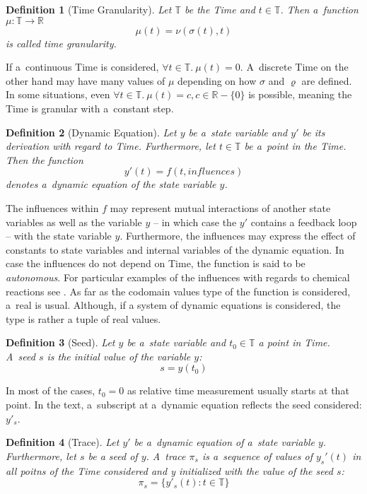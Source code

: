 \documentclass[12pt,oneside,draft]{fithesis}
\newcommand{\mReal}{\mathbb{R}}
\newcommand{\mTime}{\mathbb{T}}
\newtheorem{mydef}{Definition}
\begin{document}
\begin{mydef}[Time Granularity]
Let $\mTime$ be the Time and $t \in \mTime$. Then a~function
$\mu: \mTime \rightarrow \mReal$
	\begin{equation}
		\mu{}(t) = \nu{}(\sigma{}(t), t)
	\end{equation} is called time granularity.
\end{mydef}
If a~continuous Time is considered, $\forall{}t\in\mTime.\:\mu{}(t) = 0$.
A~discrete Time on the other hand may have many values of $\mu$
depending on how $\sigma$ and $\varrho$ are defined. In some situations,
even $\forall{}t\in\mTime.\:\mu{}(t) = c, c \in \mReal - \{0\}$ is possible,
meaning the Time is granular with a~constant step.

\begin{mydef}[Dynamic Equation]
Let $y$ be a~state variable and $y'$ be its derivation with regard to
Time. Furthermore, let $t \in \mTime$ be a~point in the Time.
Then the function
	\begin{equation}
		y'(t)=f(t, influences)
	\end{equation}
denotes a~dynamic equation of the state variable $y$.
\end{mydef}
The influences within $f$ may represent mutual interactions of another
state variables as well as the variable $y$ -- in which case the
$y'$ contains a feedback loop -- with the state variable $y$.
Furthermore, the influences may express the effect of constants to
state variables and internal variables of the dynamic equation. In case
the influences do not depend on Time, the function is said to be
\emph{autonomous}.
For particular examples of the influences with regards to
chemical reactions see \cite{sven}.
As far as the codomain values type of the function is considered, a~real
is usual. Although, if a system of dynamic equations is considered, the
type is rather a tuple of real values.

\begin{mydef}[Seed]
Let $y$ be a~state variable and $t_0 \in \mTime$ a point in Time.
A~seed $s$ is the initial value of the variable $y$:
	\begin{equation}
		s=y(t_0)
	\end{equation}
\end{mydef}
In most of the cases, $t_0 = 0$ as relative time measurement usually
starts at that point. In the text, a~subscript at a~dynamic equation
reflects the seed considered: $y'_s$.

\begin{mydef}[Trace]
Let $y'$ be a~dynamic equation of a~state variable $y$. Furthermore,
let $s$ be a seed of $y$.
A~trace $\pi_s$ is a~sequence of values of $y_s'(t)$ in all poitns
of the Time considered and y initialized with the value of the seed $s$:
	\begin{equation}
		\pi_s = \{y'_s(t) : t \in \mTime\}
	\end{equation}
\end{mydef}
\end{document}
